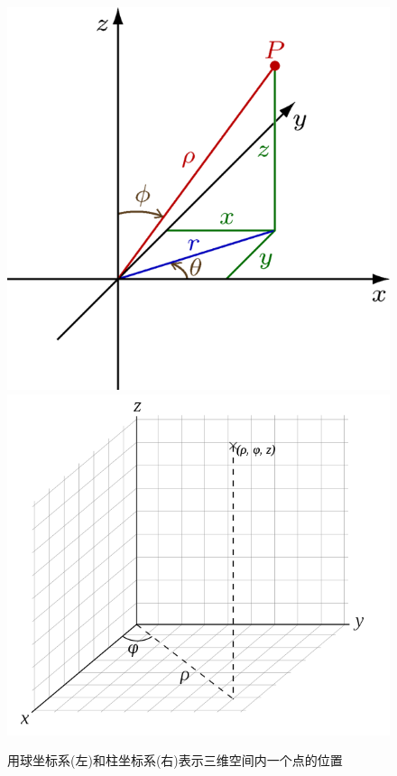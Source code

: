 \begin{figure} [ht]
\centering
\includegraphics[scale=.35]{600px-Spherical_Coordinates.png}
\includegraphics[scale=.4]{600px-Cylindrical_with_grid.svg.png}
\caption{\simsun 用球坐标系(左)和柱坐标系(右)表示三维空间内一个点的位置}
\label{600px-Cylindrical_with_grid.svg.png_600px-Spherical_Coordinates.png}
\end{figure}

